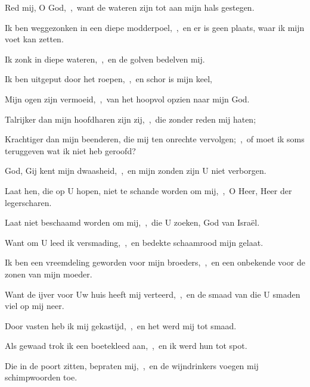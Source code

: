 \documentclass[12pt,twoside,a5paper]{article}
\begin{document}



\begin{halfparskip}
  Red mij, O God,~\sep\ want de wateren zijn tot aan mijn hals gestegen.


  Ik ben weggezonken in een diepe modderpoel,~\sep\ en er is geen plaats, waar ik mijn voet kan zetten.

  Ik zonk in diepe wateren,~\sep\ en de golven bedelven mij.

  Ik ben uitgeput door het roepen,~\sep\ en schor is mijn keel,

  Mijn ogen zijn vermoeid,~\sep\ van het hoopvol opzien naar mijn God.

  Talrijker dan mijn hoofdharen zijn zij,~\sep\ die zonder reden mij haten;

  Krachtiger dan mijn beenderen, die mij ten onrechte vervolgen;~\sep\ of moet ik soms teruggeven wat ik niet heb geroofd?
\end{halfparskip}


\begin{halfparskip}
  God, Gij kent mijn dwaasheid,~\sep\ en mijn zonden zijn U niet verborgen.

  Laat hen, die op U hopen, niet te schande worden om mij,~\sep\ O Heer, Heer der legerscharen.

  Laat niet beschaamd worden om mij,~\sep\ die U zoeken, God van Israël.

  Want om U leed ik versmading,~\sep\ en bedekte schaamrood mijn gelaat.

  Ik ben een vreemdeling geworden voor mijn broeders,~\sep\ en een onbekende voor de zonen van mijn moeder.

  Want de ijver voor Uw huis heeft mij verteerd,~\sep\ en de smaad van die U smaden viel op mij neer.

  Door vasten heb ik mij gekastijd,~\sep\ en het werd mij tot smaad.

  Als gewaad trok ik een boetekleed aan,~\sep\ en ik werd hun tot spot.

  Die in de poort zitten, bepraten mij,~\sep\ en de wijndrinkers voegen mij schimpwoorden toe.
\end{halfparskip}
\end{document}
